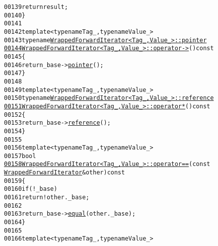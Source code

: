 \begin{footnotesize}
\begin{alltt}
00139         \textcolor{keywordflow}{return} result;
00140     \}
00141 
00142     \textcolor{keyword}{template} <\textcolor{keyword}{typename} Tag\_, \textcolor{keyword}{typename} Value\_>
00143     \textcolor{keyword}{typename} \hyperlink{classeos_1_1WrappedForwardIterator}{WrappedForwardIterator<Tag_, Value_>::pointer}
\hypertarget{wrapped__forward__iterator-impl_8hh_source_l00144}{}\hyperlink{classeos_1_1WrappedForwardIterator_af12c608415c6ee323ca93834486fc2b7}{00144}     \hyperlink{classeos_1_1WrappedForwardIterator_af12c608415c6ee323ca93834486fc2b7}{WrappedForwardIterator<Tag_, Value_>::operator-> }()\textcolor{keyword}{ const}
00145 \textcolor{keyword}{    }\{
00146         \textcolor{keywordflow}{return} \_base->\hyperlink{structeos_1_1WrappedForwardIterator_1_1Base_a3e63d544a83f5324f323f0d04c2203a3}{pointer}();
00147     \}
00148 
00149     \textcolor{keyword}{template} <\textcolor{keyword}{typename} Tag\_, \textcolor{keyword}{typename} Value\_>
00150     \textcolor{keyword}{typename} \hyperlink{classeos_1_1WrappedForwardIterator}{WrappedForwardIterator<Tag_, Value_>::reference}
\hypertarget{wrapped__forward__iterator-impl_8hh_source_l00151}{}\hyperlink{classeos_1_1WrappedForwardIterator_ae02a50270f0a0fc3ccae98a41c2d144c}{00151}     \hyperlink{classeos_1_1WrappedForwardIterator_ae02a50270f0a0fc3ccae98a41c2d144c}{WrappedForwardIterator<Tag_, Value_>::operator* }()\textcolor{keyword}{ const}
00152 \textcolor{keyword}{    }\{
00153         \textcolor{keywordflow}{return} \_base->\hyperlink{structeos_1_1WrappedForwardIterator_1_1Base_a1cffbfbcead34d38a7390173496d70df}{reference}();
00154     \}
00155 
00156     \textcolor{keyword}{template} <\textcolor{keyword}{typename} Tag\_, \textcolor{keyword}{typename} Value\_>
00157     \textcolor{keywordtype}{bool}
\hypertarget{wrapped__forward__iterator-impl_8hh_source_l00158}{}\hyperlink{classeos_1_1WrappedForwardIterator_a79398c29c6f5012a3c882db8cf61d091}{00158}     \hyperlink{classeos_1_1WrappedForwardIterator_a79398c29c6f5012a3c882db8cf61d091}{WrappedForwardIterator<Tag_, Value_>::operator== }(\textcolor{keyword}{const} 
      \hyperlink{classeos_1_1WrappedForwardIterator}{WrappedForwardIterator} & other)\textcolor{keyword}{ const}
00159 \textcolor{keyword}{    }\{
00160         \textcolor{keywordflow}{if} (! \_base)
00161             \textcolor{keywordflow}{return} ! other.\_base;
00162 
00163         \textcolor{keywordflow}{return} \_base->\hyperlink{structeos_1_1WrappedForwardIterator_1_1Base_a4ec070b72367be2f7f52babe05c1f9bc}{equal}(other.\_base);
00164     \}
00165 
00166     \textcolor{keyword}{template} <\textcolor{keyword}{typename} Tag\_, \textcolor{keyword}{typename} Value\_>

\end{alltt}
\end{footnotesize}
